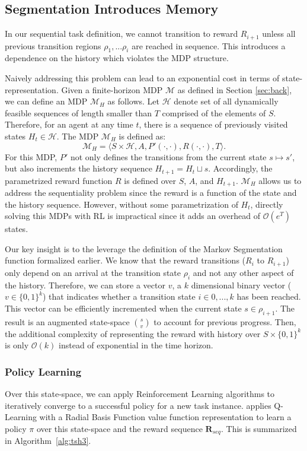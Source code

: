 \subsection{Segmentation Introduces Memory}
In our sequential task definition, we cannot transition to reward $R_{i+1}$ unless all previous transition regions $\rho_{1},...\rho_{i}$ are reached in sequence.
This introduces a dependence on the history which violates the MDP structure.

Naively addressing this problem can lead to an exponential cost in terms of state-representation.
Given a finite-horizon MDP $\mathcal{M}$ as defined in Section \ref{sec:back}, we can define an MDP $\mathcal{M}_H$ as follows.
Let $\mathcal{H}$ denote set of all dynamically feasible sequences of length smaller than $T$ comprised of the elements of $S$.
Therefore, for an agent at any time $t$, there is a sequence of previously visited states $H_t \in \mathcal{H}$.
The MDP $\mathcal{M}_H$ is defined as:
\[
\mathcal{M}_H = \langle S \times \mathcal{H},A,P'(\cdot,\cdot), R(\cdot,\cdot),T \rangle.
\]
For this MDP, $P'$ not only defines the transitions from the current state $s \mapsto s'$, but also increments the history sequence $H_{t+1} = H_{t} \sqcup s$.
Accordingly, the parametrized reward function $R$ is defined over $S$, $A$, and $H_{t+1}$.
$\mathcal{M}_H$ allows us to address the sequentiality problem since the reward is a function of the state and the history sequence.
However, without some parametrization of $H_t$, directly solving this MDPs with RL is impractical since it adds an overhead of $\mathcal{O}(e^{T})$ states.

Our key insight is to the leverage the definition of the Markov Segmentation function formalized earlier.
We know that the reward transitions ($R_{i}$ to $R_{i+1}$) only depend on an arrival at the transition state $\rho_{i}$ and not any other aspect of the history.
Therefore, we can store a vector $v$, a $k$ dimensional binary vector ($v \in \{0,1\}^k$) that indicates whether a transition state $i \in 0,...,k$ has been reached.
This vector can be efficiently incremented when the current state $s \in \rho_{i+1}$.
The result is an augmented state-space $\binom{s}{v}$ to account for previous progress.
Then, the additional complexity of representing the reward with history over $S \times  \{0,1\}^k$ is only $\mathcal{O}(k)$ instead of exponential in the time horizon.

\subsubsection{Policy Learning}
Over this state-space, we can apply Reinforcement Learning algorithms to iteratively converge to a successful policy for a new task instance.
\hirl applies Q-Learning with a Radial Basis Function value function representation to learn a policy $\pi$ over this state-space and the reward sequence $\mathbf{R}_{seq}$.
This is summarized in Algorithm~\ref{alg:tsh3}.



